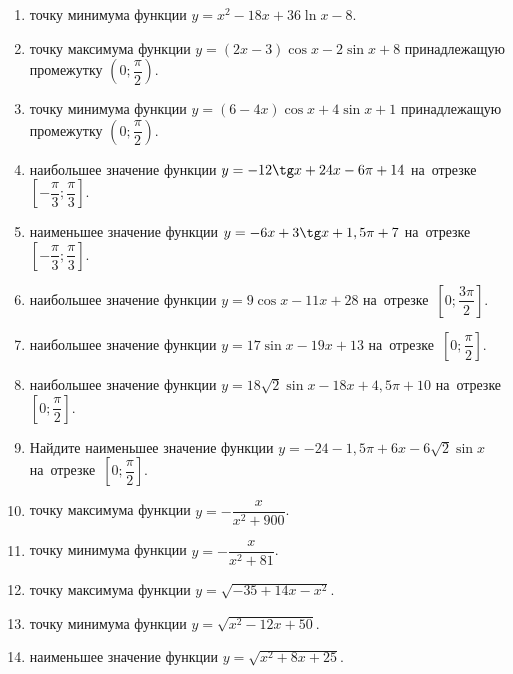 \documentclass[a4paper,10pt]{article}
\begin{document}
\begin{enumerate}
\item {} точку минимума функции $y=x^2-18x+36\ln x -8$.

\item {} точку максимума функции $y=\left(2x-3\right)\cos x -2\sin x+8$
принадлежащую промежутку $\left(0;\dfrac{\pi}{2}\right)$.

\item {} точку минимума функции $y=\left(6-4x\right)\cos x +4\sin x+1$
принадлежащую промежутку $\left(0;\dfrac{\pi}{2}\right)$.

\item {} наибольшее значение функции $y=-12\tg x +24x-6\pi +14$ на~отрезке~$\left[-\dfrac{\pi}{3};\dfrac{\pi}{3}\right]$.

\item {} наименьшее значение функции $y=-6x +3\tg x+1,5\pi+7$ на~отрезке~$\left[-\dfrac{\pi}{3};\dfrac{\pi}{3}\right]$.

\item {} наибольшее значение функции $y=9\cos x-11x+28$ на~отрезке~$\left[0;\dfrac{3\pi}{2}\right]$.

\item {} наибольшее значение функции $y=17\sin x-19x+13$ на~отрезке~$\left[0;\dfrac{\pi}{2}\right]$.

\item {} наибольшее значение функции $y=18\sqrt{2}\sin x-18x+4,5\pi +10$ на~отрезке~$\left[0;\dfrac{\pi}{2}\right]$.

\item Найдите наименьшее значение функции $y=-24-1,5\pi+6x-6\sqrt{2}\sin x$ на~отрезке~$\left[0;\dfrac{\pi}{2}\right]$.

\item {} точку максимума функции $y=-\dfrac{x}{ x^2 +900}$.

\item {} точку минимума функции $y=-\dfrac{x}{ x^2 +81}$.

\item {} точку максимума функции $y=\sqrt{-35+14x-x^2}$.

\item {} точку минимума функции $y=\sqrt{x^2-12x+50}$.

\item {} наименьшее значение функции $y=\sqrt{x^2+8x+25}$.


\end{enumerate}
\end{document}
